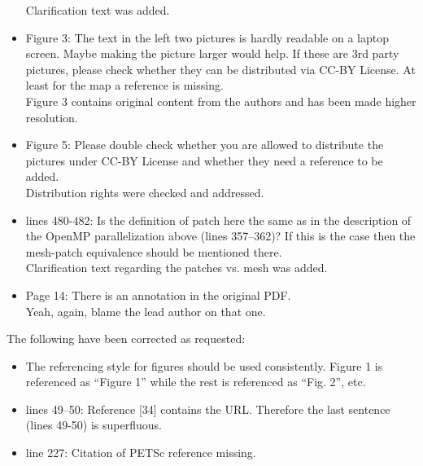 \documentclass{letter}
\begin{document}
\begin{letter}
\begin{itemize}
    Clarification text was added. \\

    \item Figure 3:  The text in the left two pictures is hardly readable on a
    laptop screen. Maybe making the picture larger would help. If these are 3rd
    party pictures, please check whether they can be distributed via CC-BY
    License. At least for the map a reference is missing. \\

    Figure 3 contains original content from the authors and has been made higher resolution. \\

    \item Figure 5:  Please double check whether you are allowed to distribute
    the pictures under CC-BY License and whether they need a reference to be
    added. \\

    Distribution rights were checked and addressed. \\

    \item lines 480-482: Is the definition of patch here the same as in the
    description of the OpenMP parallelization above (lines 357--362)? If this is
    the case then the mesh-patch equivalence should be mentioned there. \\

    Clarification text regarding the patches vs. mesh was added. \\

    \item Page 14:  There is an annotation in the original PDF. \\

    Yeah, again, blame the lead author on that one.

\end{itemize}

The following have been corrected as requested:
\begin{itemize}
    \item The referencing style for figures should be used consistently. Figure
    1 is referenced as ``Figure 1'' while the rest is referenced as ``Fig. 2'',
    etc.

    \item lines 49--50: Reference [34] contains the URL. Therefore the last
    sentence (lines 49-50) is superfluous.

    \item line 227: Citation of PETSc reference missing.


\end{itemize}
\end{letter}
\end{document}
